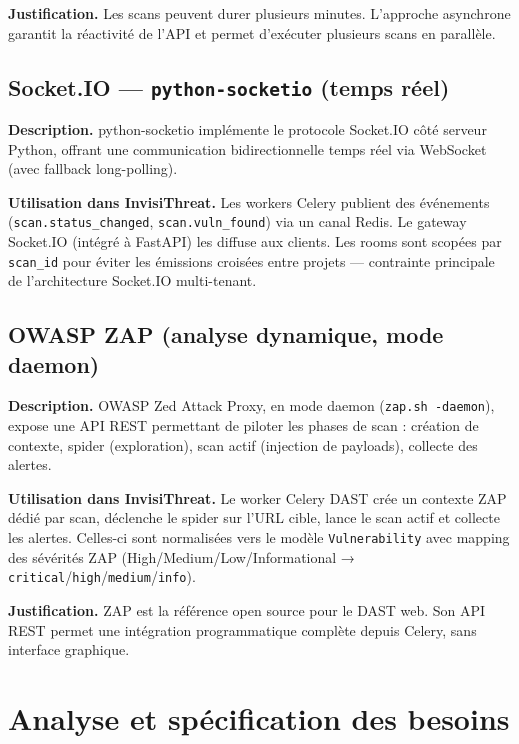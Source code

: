 \textbf{Justification.} Les scans peuvent durer plusieurs minutes. L'approche asynchrone garantit la réactivité de l'API et permet d'exécuter plusieurs scans en parallèle.

\subsection{Socket.IO — \texttt{python-socketio} (temps réel)}

\textbf{Description.} python-socketio implémente le protocole Socket.IO côté serveur Python, offrant une communication bidirectionnelle temps réel via WebSocket (avec fallback long-polling).

\textbf{Utilisation dans InvisiThreat.} Les workers Celery publient des événements (\texttt{scan.status\_changed}, \texttt{scan.vuln\_found}) via un canal Redis. Le gateway Socket.IO (intégré à FastAPI) les diffuse aux clients. Les rooms sont scopées par \texttt{scan\_id} pour éviter les émissions croisées entre projets — contrainte principale de l'architecture Socket.IO multi-tenant.

\subsection{OWASP ZAP (analyse dynamique, mode daemon)}

\textbf{Description.} OWASP Zed Attack Proxy, en mode daemon (\texttt{zap.sh -daemon}), expose une API REST permettant de piloter les phases de scan : création de contexte, spider (exploration), scan actif (injection de payloads), collecte des alertes.

\textbf{Utilisation dans InvisiThreat.} Le worker Celery DAST crée un contexte ZAP dédié par scan, déclenche le spider sur l'URL cible, lance le scan actif et collecte les alertes. Celles-ci sont normalisées vers le modèle \texttt{Vulnerability} avec mapping des sévérités ZAP (High/Medium/Low/Informational → \texttt{critical}/\texttt{high}/\texttt{medium}/\texttt{info}).

\textbf{Justification.} ZAP est la référence open source pour le DAST web. Son API REST permet une intégration programmatique complète depuis Celery, sans interface graphique.

\section{Analyse et spécification des besoins}

